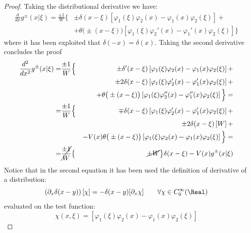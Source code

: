 \documentclass[Main]{subfiles}
\begin{document}
\begin{proof}
		Taking the distributional derivative we have:
		\begin{eqnarray}
		\frac{d}{dx}g^\pm(x \vert \xi) 	=\frac{\pm 1}{W} \Big\{&
						\pm \delta(x-\xi)\left[ \varphi_1(\xi)\varphi_2(x)-\varphi_1(x)\varphi_2(\xi)\right] + \nonumber \\ 
					&	+ \theta\big( \pm (x-\xi) \big) \left[ \varphi_1(\xi)\varphi_2'(x)-\varphi_1'(x)\varphi_2(\xi)\right]
					\Big\}
		\end{eqnarray}
		where it has been exploited that $\delta(-x) = \delta(x)$.
		Taking the second derivative concludes the proof
		\begin{eqnarray*}
		\frac{d^2}{dx^2}g^\pm(x \vert \xi) 	=&\frac{\pm 1}{W} \Big\{&
						\pm \delta'(x-\xi)\left[ \varphi_1(\xi)\varphi_2(x)-\varphi_1(x)\varphi_2(\xi)\right] +  \\ 
				&	&	\pm 2\delta(x-\xi) \left[ \varphi_1(\xi)\varphi_2'(x)-\varphi_1'(x)\varphi_2(\xi)\right] +  \\
				& & + \theta\big( \pm (x-\xi) \big) \left[ \varphi_1(\xi)\varphi_2''(x)-\varphi_1''(x)\varphi_2(\xi)\right]
					\Big\}=  \\
				=&\frac{\pm 1}{W} \Big\{&
						\mp \delta(x-\xi)\left[ \varphi_1(\xi)\varphi_2'(x)-\varphi_1'(x)\varphi_2(\xi)\right] +  \\ 
				&	&	\pm 2\delta(x-\xi) \left[W\right] +  \\
				& & -V(x) \theta\big( \pm (x-\xi) \big) \left[ \varphi_1(\xi)\varphi_2(x)-\varphi_1(x)\varphi_2(\xi)\right]
					\Big\}=  \\
				=&\cancel{ \frac{\pm 1}{W}}\big\{& \cancel{\pm W}\big\} \delta(x-\xi)  - V(x) g^\pm( x \vert \xi)
		\end{eqnarray*}
		Notice that in the second equation it has been used the definition of derivative of a distribution:
		\begin{displaymath}
			\left( \partial_x \delta ( x- y) \right)\left[\chi \right] =  - \delta(x-y) [ \partial_x\chi] \qquad \forall \chi \in C^\infty_0(\Real)
		\end{displaymath}
		evaluated on the test function:
		\begin{displaymath}
			\chi(x,\xi) = \left[ \varphi_1(\xi)\varphi_2(x)-\varphi_1(x)\varphi_2(\xi)\right]
		\end{displaymath}

	\end{proof}
\end{document}

